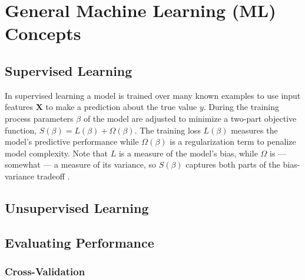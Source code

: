 \chapter{General Machine Learning (ML) Concepts}
\label{chap:ml_general}

\section{Supervised Learning}
\label{ml_general:supervised}

In supervised learning a model is trained over many known examples
to use input features $\mathbf{X}$ to make a prediction \yhat about the true value $y$.
During the training process parameters $\beta$ of
the model are adjusted to minimize a two-part objective function,
$S\left(\beta\right) = L\left(\beta\right) + \Omega\left(\beta\right)$.
The training loss $L\left(\beta\right)$ measures the model's predictive performance
while $\Omega\left(\beta\right)$ is a regularization term to penalize model complexity.
Note that $L$ is a measure of the model's bias,
while $\Omega$ is --- somewhat --- a measure of its variance,
so $S\left(\beta\right)$ captures both parts of the bias-variance tradeoff \cite{HastieTF09}.

\section{Unsupervised Learning}
\label{ml_general:unsupervised}

\section{Evaluating Performance}
\label{ml_general:eval}

\subsection{Cross-Validation}
\label{ml_general:eval:cv}

